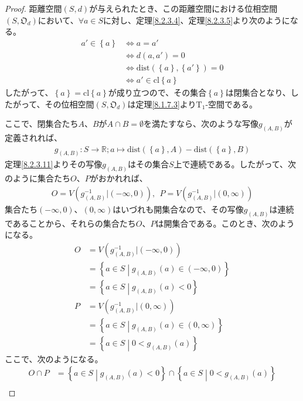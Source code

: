 \documentclass[dvipdfmx]{jsarticle}
\begin{document}
\begin{proof}
距離空間$(S,d)$が与えられたとき、この距離空間における位相空間$\left( S,\mathfrak{O}_{d} \right)$において、$\forall a \in S$に対し、定理\ref{8.2.3.4}、定理\ref{8.2.3.5}より次のようになる。
\begin{align*}
a' \in \left\{ a \right\} &\Leftrightarrow a = a'\\
&\Leftrightarrow d\left( a,a' \right) = 0\\
&\Leftrightarrow \mathrm{dist}\left( \left\{ a \right\},\left\{ a' \right\} \right) = 0\\
&\Leftrightarrow a' \in {\mathrm{cl}}\left\{ a \right\}
\end{align*}
したがって、$\left\{ a \right\} = {\mathrm{cl}}\left\{ a \right\}$が成り立つので、その集合$\left\{ a \right\}$は閉集合となり、したがって、その位相空間$\left( S,\mathfrak{O}_{d} \right)$は定理\ref{8.1.7.3}より$\mathrm{T}_{1}$-空間である。\par
ここで、閉集合たち$A$、$B$が$A \cap B = \emptyset$を満たすなら、次のような写像$g_{(A,B)}$が定義されれば、
\begin{align*}
g_{(A,B)}:S \rightarrow \mathbb{R};a \mapsto \mathrm{dist}\left( \left\{ a \right\},A \right) - \mathrm{dist}\left( \left\{ a \right\},B \right)
\end{align*}
定理\ref{8.2.3.11}よりその写像$g_{(A,B)}$はその集合$S$上で連続である。したがって、次のように集合たち$O$、$P$がおかれれば、
\begin{align*}
O = V\left( g_{(A,B)}^{- 1}|( - \infty,0) \right),\ \ P = V\left( g_{(A,B)}^{- 1}|(0,\infty) \right)
\end{align*}
集合たち$( - \infty,0)$、$(0,\infty)$はいづれも開集合なので、その写像$g_{(A,B)}$は連続であることから、それらの集合たち$O$、$P$は開集合である。このとき、次のようになる。
\begin{align*}
O &= V\left( g_{(A,B)}^{- 1}|( - \infty,0) \right)\\
&= \left\{ a \in S \middle| g_{(A,B)}(a) \in ( - \infty,0) \right\}\\
&= \left\{ a \in S \middle| g_{(A,B)}(a) < 0 \right\}\\
P &= V\left( g_{(A,B)}^{- 1}|(0,\infty) \right)\\
&= \left\{ a \in S \middle| g_{(A,B)}(a) \in (0,\infty) \right\}\\
&= \left\{ a \in S \middle| 0 < g_{(A,B)}(a) \right\}
\end{align*}
ここで、次のようになる。
\begin{align*}
O \cap P &= \left\{ a \in S \middle| g_{(A,B)}(a) < 0 \right\} \cap \left\{ a \in S \middle| 0 < g_{(A,B)}(a) \right\}\\

\end{align*}
\end{proof}
\end{document}

